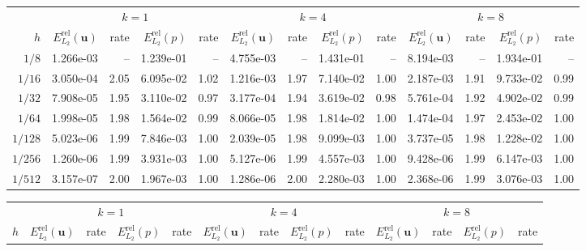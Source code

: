 \begin{landscape}
\thispagestyle{empty}
\begin{center}
\centering
{}
\label{tab:annulus_thieulot_v2_p0_disc}
\small
\begin{tabular}{
r rr rr rr rr rr rr
}
\toprule
& \multicolumn{4}{c}{$k=1$} & \multicolumn{4}{c}{$k=4$} & \multicolumn{4}{c}{$k=8$} \\
\cmidrule(lr){2-5}\cmidrule(lr){6-9}\cmidrule(lr){10-13}
$h$ & $E_{L_2}^{\mathrm{rel}}(\mathbf{u})$ & rate & $E_{L_2}^{\mathrm{rel}}(p)$ & rate & $E_{L_2}^{\mathrm{rel}}(\mathbf{u})$ & rate & $E_{L_2}^{\mathrm{rel}}(p)$ & rate & $E_{L_2}^{\mathrm{rel}}(\mathbf{u})$ & rate & $E_{L_2}^{\mathrm{rel}}(p)$ & rate \\
\midrule
$1/8$ & 1.266e-03 & -- & 1.239e-01 & -- & 4.755e-03 & -- & 1.431e-01 & -- & 8.194e-03 & -- & 1.934e-01 & -- \\
$1/16$ & 3.050e-04 & 2.05 & 6.095e-02 & 1.02 & 1.216e-03 & 1.97 & 7.140e-02 & 1.00 & 2.187e-03 & 1.91 & 9.733e-02 & 0.99 \\
$1/32$ & 7.908e-05 & 1.95 & 3.110e-02 & 0.97 & 3.177e-04 & 1.94 & 3.619e-02 & 0.98 & 5.761e-04 & 1.92 & 4.902e-02 & 0.99 \\
$1/64$ & 1.998e-05 & 1.98 & 1.564e-02 & 0.99 & 8.066e-05 & 1.98 & 1.814e-02 & 1.00 & 1.474e-04 & 1.97 & 2.453e-02 & 1.00 \\
$1/128$ & 5.023e-06 & 1.99 & 7.846e-03 & 1.00 & 2.039e-05 & 1.98 & 9.099e-03 & 1.00 & 3.737e-05 & 1.98 & 1.228e-02 & 1.00 \\
$1/256$ & 1.260e-06 & 1.99 & 3.931e-03 & 1.00 & 5.127e-06 & 1.99 & 4.557e-03 & 1.00 & 9.428e-06 & 1.99 & 6.147e-03 & 1.00 \\
$1/512$ & 3.157e-07 & 2.00 & 1.967e-03 & 1.00 & 1.286e-06 & 2.00 & 2.280e-03 & 1.00 & 2.368e-06 & 1.99 & 3.076e-03 & 1.00 \\
\bottomrule
\end{tabular}
\end{center}
\begin{center}
\centering
{}
\label{tab:annulus_thieulot_v2_p1_disc}
\small
\begin{tabular}{
r rr rr rr rr rr rr
}
\toprule
& \multicolumn{4}{c}{$k=1$} & \multicolumn{4}{c}{$k=4$} & \multicolumn{4}{c}{$k=8$} \\
\cmidrule(lr){2-5}\cmidrule(lr){6-9}\cmidrule(lr){10-13}
$h$ & $E_{L_2}^{\mathrm{rel}}(\mathbf{u})$ & rate & $E_{L_2}^{\mathrm{rel}}(p)$ & rate & $E_{L_2}^{\mathrm{rel}}(\mathbf{u})$ & rate & $E_{L_2}^{\mathrm{rel}}(p)$ & rate & $E_{L_2}^{\mathrm{rel}}(\mathbf{u})$ & rate & $E_{L_2}^{\mathrm{rel}}(p)$ & rate \\

\end{tabular}
\end{center}
\end{landscape}
